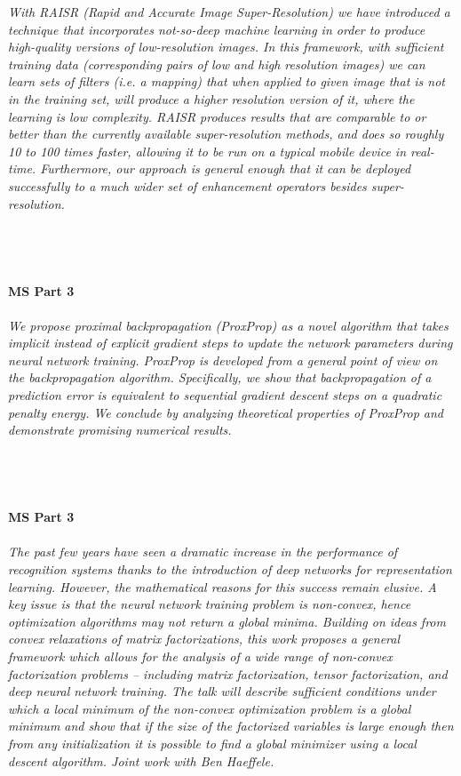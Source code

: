 \begin{multicols}{2}
    \textit{With RAISR (Rapid and Accurate Image Super-Resolution) we have introduced a technique that incorporates not-so-deep machine learning in order to produce high-quality versions of low-resolution images. In this framework, with sufficient training data (corresponding pairs of low and high resolution images) we can learn sets of filters (i.e. a mapping) that when applied to given image that is not in the training set, will produce a higher resolution version of it, where the learning is low complexity. RAISR produces results that are comparable to or better than the currently available super-resolution methods, and does so roughly 10 to 100 times faster, allowing it to be run on a typical mobile device in real-time. Furthermore, our approach is general enough that it can be deployed successfully to a much wider set of enhancement operators besides super-resolution. }\\
\\ 
    \\
    \\\\
    \noindent\textbf{MS Part 3}\\
\\  
    \textit{We propose proximal backpropagation (ProxProp) as a novel algorithm that takes implicit instead of explicit gradient steps to update the network parameters during neural network training. ProxProp is developed from a general point of view on the backpropagation algorithm. Specifically, we show that backpropagation of a prediction error is equivalent to sequential gradient descent steps on a quadratic penalty energy. We conclude by analyzing theoretical properties of ProxProp and demonstrate promising numerical results.}\\
\\ 
    \\
    \\\\
    \noindent\textbf{MS Part 3}\\
\\  
    \textit{The past few years have seen a dramatic increase in the performance of recognition systems thanks to the introduction of deep networks for representation learning. However, the mathematical reasons for this success remain elusive. A key issue is that the neural network training problem is non-convex, hence optimization algorithms may not return a global minima. Building on ideas from convex relaxations of matrix factorizations, this work proposes a general framework which allows for the analysis of a wide range of non-convex factorization problems – including matrix factorization, tensor factorization, and deep neural network training. The talk will describe sufficient conditions under which a local minimum of the non-convex optimization problem is a global minimum and show that if the size of the factorized variables is large enough then from any initialization it is possible to find a global minimizer using a local descent algorithm. Joint work with Ben Haeffele.}\\

\end{multicols}
